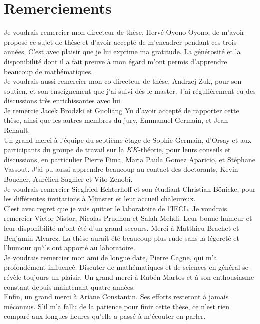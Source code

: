\section*{Remerciements}

Je voudrais remercier mon directeur de thèse, Hervé Oyono-Oyono, de m'avoir proposé ce sujet de thèse et d'avoir accepté de m'encadrer pendant ces trois années. C'est avec plaisir que je lui exprime ma gratitude. La générosité et la disponibilité dont il a fait preuve à mon égard m'ont permis d'apprendre beaucoup de mathématiques.\\%

Je voudrais aussi remercier mon co-directeur de thèse, Andrzej Zuk, pour son soutien, et son enseignement que j'ai suivi dès le master. J'ai régulièrement eu des discussions très enrichissantes avec lui.\\

Je remercie Jacek Brodzki et Guoliang Yu d'avoir accepté de rapporter cette thèse, ainsi que les autres membres du jury, Emmanuel Germain, et Jean Renault.\\   

Un grand merci à l'équipe du septième étage de Sophie Germain, d'Orsay et aux participants du groupe de travail sur la $KK$-théorie, pour leurs conseils et discussions, en particulier Pierre Fima, Maria Paula Gomez Aparicio, et Stéphane Vassout. J'ai pu aussi apprendre beaucoup au contact des doctorants, Kevin Boucher, Aurélien Sagnier et Vito Zenobi. \\

Je voudrais remercier Siegfried Echterhoff et son étudiant Christian Bönicke, pour les différentes invitations à Münster et leur accueil chaleureux.\\

C'est avec regret que je vais quitter le laboratoire de l'IECL. Je voudrais remercier Victor Nistor, Nicolas Prudhon et Salah Mehdi. Leur bonne humeur et leur disponibilité m'ont été d'un grand secours. Merci à Matthieu Brachet et Benjamin Alvarez. La thèse aurait été beaucoup plus rude sans la légereté et l'humour qu'ils ont apporté au laboratoire. \\

Je voudrais remercier mon ami de longue date, Pierre Cagne, qui m'a profondément influencé. Discuter de mathématiques et de sciences en général se révèle toujours un plaisir. Un grand merci à Rubén Martos et à son enthousiasme constant depuis maintenant quatre années. \\

Enfin, un grand merci à Ariane Constantin. Ses efforts resteront à jamais méconnus. S'il m'a fallu de la patience pour finir cette thèse, ce n'est rien comparé aux longues heures qu'elle a passé à m'écouter en parler.\\   


